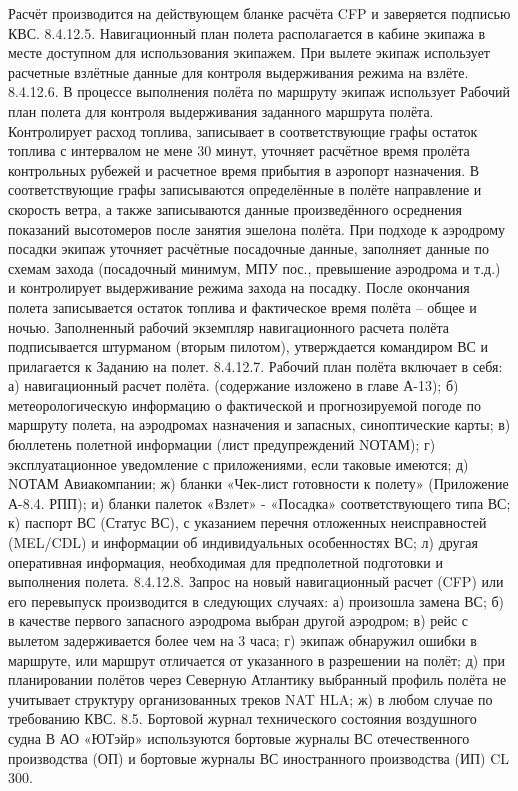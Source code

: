 Расчёт производится на действующем бланке расчёта CFP и заверяется подписью КВС.
8.4.12.5. Навигационный план полета располагается в кабине экипажа в месте доступном для использования экипажем. При вылете экипаж использует расчетные взлётные данные для контроля выдерживания режима на взлёте.
8.4.12.6. В процессе выполнения полёта по маршруту экипаж использует Рабочий план полета для контроля выдерживания заданного маршрута полёта. Контролирует расход топлива, записывает в соответствующие графы остаток топлива с интервалом не мене 30 минут, уточняет расчётное время пролёта контрольных рубежей и расчетное время прибытия в аэропорт назначения.
В соответствующие графы записываются определённые в полёте направление и скорость ветра, а также записываются данные произведённого осреднения показаний высотомеров после занятия эшелона полёта.
При подходе к аэродрому посадки экипаж уточняет расчётные посадочные данные, заполняет данные по схемам захода (посадочный минимум, МПУ пос., превышение аэродрома и т.д.) и контролирует выдерживание режима захода на посадку. 
После окончания полета записывается остаток топлива и фактическое время полёта – общее и ночью. Заполненный рабочий экземпляр навигационного расчета полёта подписывается штурманом (вторым пилотом), утверждается командиром ВС и прилагается к Заданию на полет.
8.4.12.7. Рабочий план полёта включает в себя: 
а)	навигационный расчет полёта. (содержание изложено в главе А-13); 
б)	метеорологическую информацию о фактической и прогнозируемой погоде по маршруту полета, на аэродромах назначения и запасных, синоптические карты;
в)	бюллетень полетной информации (лист предупреждений NОТАМ); 
г)	эксплуатационное уведомление с приложениями, если таковые имеются;
д)	NОТАМ Авиакомпании; 
ж)  бланки «Чек-лист готовности к полету» (Приложение А-8.4. РПП); 
и)  бланки палеток «Взлет» - «Посадка» соответствующего типа ВС; 
к)  паспорт ВС (Статус ВС), с указанием перечня отложенных неисправностей (MEL/CDL) и информации об индивидуальных особенностях ВС; 
л) другая оперативная информация, необходимая для предполетной подготовки и выполнения полета. 
8.4.12.8. Запрос на новый навигационный расчет (CFP) или его перевыпуск производится в следующих случаях: 
а)	произошла замена ВС; 
б)	в качестве первого запасного аэродрома выбран другой аэродром; 
в)	рейс с вылетом задерживается более чем на 3 часа; 
г)	экипаж обнаружил ошибки в маршруте, или маршрут отличается от указанного в разрешении на полёт; 
д)	при планировании полётов через Северную Атлантику выбранный профиль полёта не учитывает структуру организованных треков NAT HLA; 
ж)  в любом случае по требованию КВС. 
8.5. Бортовой журнал технического состояния воздушного судна
В АО «ЮТэйр» используются бортовые журналы ВС отечественного производства (ОП) и бортовые журналы ВС иностранного производства (ИП) CL 300.

